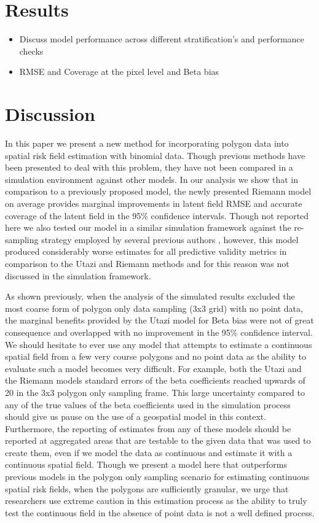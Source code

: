 \documentclass{article}
\begin{document}
\section{Results}\label{results}

\begin{itemize}
\item  Discuss model performance across different stratification's and performance checks
\item RMSE and Coverage at the pixel level and Beta bias
\end{itemize}

\section{Discussion}\label{discussion}

In this paper we present a new method for incorporating polygon data into spatial risk field estimation with binomial data. Though previous methods have been presented to deal with this problem, they have not been compared in a simulation environment against other models. In our analysis we show that in comparison to a previously proposed model, the newly presented Riemann model on average provides marginal improvements in latent field RMSE and accurate coverage of the latent field in the 95\% confidence intervals. Though not reported here we also tested our model in a similar simulation framework against the re-sampling strategy employed by several previous authors \cite{Golding2017, Reiner2018}, however, this model produced considerably worse estimates for all predictive validity metrics in comparison to the Utazi and Riemann methods and for this reason was not discussed in the simulation framework.  

As shown previously, when the analysis of the simulated results excluded the most coarse form of polygon only data sampling (3x3 grid) with no point data, the marginal benefits provided by the Utazi model for Beta bias were not of great consequence and overlapped with no improvement in the 95\% confidence interval. We should hesitate to ever use any model that attempts to estimate a continuous spatial field from a few very course polygons and no point data as the ability to evaluate such a model becomes very difficult. For example, both the Utazi and the Riemann models standard errors of the beta coefficients reached upwards of 20 in the 3x3 polygon only sampling frame. This large uncertainty compared to any of the true values of the beta coefficients used in the simulation process should give us pause on the use of a geospatial model in this context. Furthermore, the reporting of estimates from any of these models should be reported at aggregated areas that are testable to the given data that was used to create them, even if we model the data as continuous and estimate it with a continuous spatial field. Though we present a model here that outperforms previous models in the polygon only sampling scenario for estimating continuous spatial risk fields, when the polygons are sufficiently granular, we urge that researchers use extreme caution in this estimation process as the ability to truly test the continuous field in the absence of point data is not a well defined process. 
\end{document}
